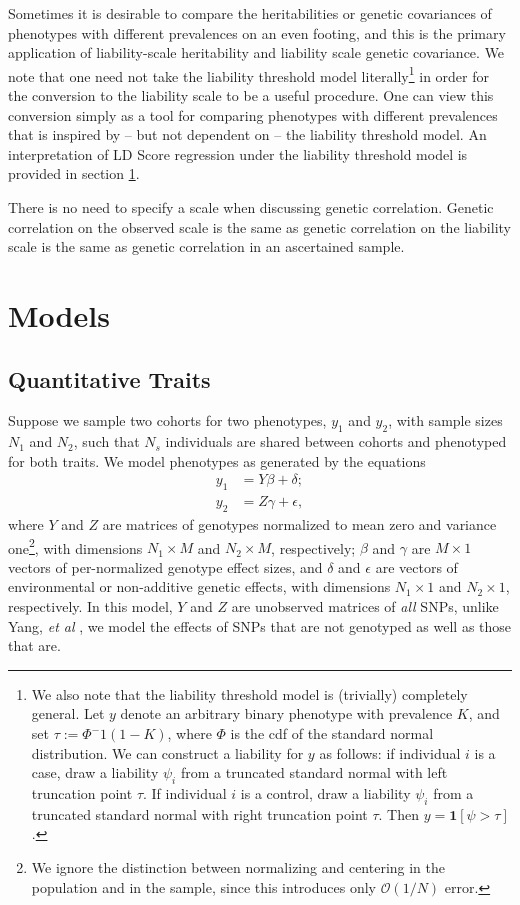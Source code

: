 \documentclass[11pt]{article}
\numberwithin{equation}{section}
\numberwithin{definition}{section}
\numberwithin{thm}{section}
\numberwithin{lemma}{section}
\numberwithin{prop}{section}
\numberwithin{cor}{section}
\numberwithin{hyp}{section}
\begin{document}
Sometimes it is desirable to compare the heritabilities or genetic covariances of phenotypes with different prevalences on an even footing,
and this is the primary application of liability-scale heritability and liability scale genetic covariance.
We note that one need not take the liability threshold model literally\footnote{We also note that the liability threshold model is (trivially) completely general. Let $y$ denote an arbitrary binary phenotype with prevalence $K$, and set $\tau := \Phi^-{1}(1-K)$, where $\Phi$ is the cdf of the standard normal distribution. We can construct a liability for $y$ as follows: if individual $i$ is a case, draw a liability $\psi_i$ from a truncated standard normal with left truncation point $\tau$. If individual $i$ is a control, draw a liability $\psi_i$ from a truncated standard normal with right truncation point $\tau$. Then $y=\mathbf{1}[\psi > \tau]$.}
in order for the conversion to the liability scale to be a useful procedure.
One can view this conversion simply as a tool for comparing phenotypes with different prevalences that is inspired by --
but not dependent on -- the liability threshold model.
An interpretation of LD Score regression under the liability threshold model is provided in section \ref{}.

There is no need to specify a scale when discussing genetic correlation. 
Genetic correlation on the observed scale is the same as genetic correlation on the liability scale is the same as genetic correlation in an ascertained sample.
	
\section{Models}
\subsection{Quantitative Traits}\label{ctsmodel}

Suppose we sample two cohorts for two phenotypes,
$y_1$ and $y_2$,
with sample sizes $N_1$ and $N_2$,
such that $N_s$ individuals are shared between cohorts and phenotyped for both traits.
We model phenotypes as generated by the equations
\begin{align*}
	y_1 &= Y\beta + \delta;\\
	y_2 &= Z\gamma + \epsilon,
\end{align*}
where $Y$ and $Z$ are matrices of genotypes normalized to mean zero and variance one\footnote{
We ignore the distinction between normalizing and centering in the population and in the sample, 
since this introduces only $\mathscr{O}(1/N)$ error.},
with dimensions $N_1\times M$ and $N_2\times M$, respectively; 
$\beta$ and $\gamma$ are $M\times 1$ vectors of per-normalized genotype effect sizes,
and $\delta$ and $\epsilon$ are vectors of environmental or non-additive genetic effects,
with dimensions $N_1\times 1$ and $N_2\times 1$, respectively.
In this model, $Y$ and $Z$ are unobserved matrices of \emph{all} SNPs,
unlike Yang, \emph{et al} \cite{yang2010}, 
we model the effects of SNPs that are not genotyped as well as those that are.
\end{document}
